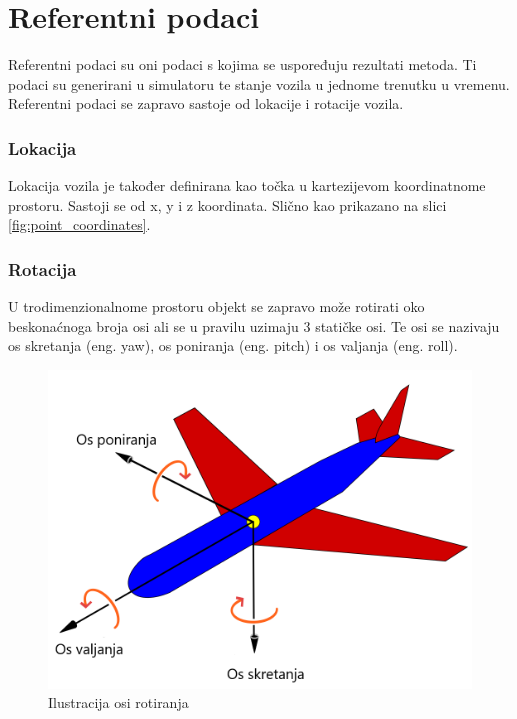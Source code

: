 \section{Referentni podaci}

Referentni podaci su oni podaci s kojima se uspoređuju rezultati metoda. Ti podaci su generirani u simulatoru te stanje vozila u jednome trenutku u vremenu. Referentni podaci se zapravo sastoje od lokacije i rotacije vozila.

\subsubsection{Lokacija}
Lokacija vozila je također definirana kao točka u kartezijevom koordinatnome prostoru. Sastoji se od x, y i z koordinata. Slično kao prikazano na slici \ref{fig:point_coordinates}.

\subsubsection{Rotacija}
 U trodimenzionalnome prostoru objekt se zapravo može rotirati oko beskonaćnoga broja osi ali se u pravilu uzimaju 3 statičke osi. Te osi se nazivaju os skretanja (eng. yaw), os poniranja (eng. pitch) i os valjanja (eng. roll). 

\begin{figure}[!ht]
  \centering
  \includegraphics[scale=0.3]{images/yaw_roll_pitch_example.png}
  \caption{Ilustracija osi rotiranja \cite{apa}}
  \label{fig:yaw_roll_pitch_example}
\end{figure}

